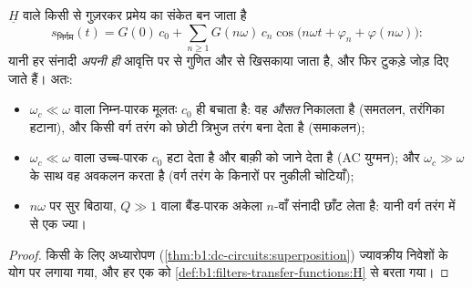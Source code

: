 \begin{proposition}\label{prop:b1:filters-transfer-functions:filtering}
 $\underline H$ वाले किसी  से गुज़रकर प्रमेय का संकेत
बन जाता है
\[
s_{\text{निर्गम}}(t) = G(0)\,c_0 + \sum_{n \geq 1} G(n\omega)\,c_n\cos\!\big(n\omega t + \varphi_n + \varphi(n\omega)\big):
\]
यानी हर संनादी \emph{अपनी ही} आवृत्ति पर  से गुणित और  से खिसकाया
जाता है, और फिर टुकड़े जोड़ दिए जाते हैं। अतः:
\begin{itemize}
  \item $\omega_c \ll \omega$ वाला निम्न-पारक मूलतः $c_0$ ही बचाता है:
        वह \emph{औसत} निकालता है (समतलन, तरंगिका हटाना), और किसी
        वर्ग तरंग को छोटी त्रिभुज तरंग बना देता है (समाकलन);
  \item $\omega_c \ll \omega$ वाला उच्च-पारक $c_0$ हटा देता है और बाक़ी को
        जाने देता है (AC युग्मन); और $\omega_c \gg \omega$ के साथ वह
        अवकलन करता है (वर्ग तरंग के किनारों पर नुकीली चोटियाँ);
  \item $n\omega$ पर सुर बिठाया, $Q \gg 1$ वाला बैंड-पारक अकेला
        $n$-वाँ संनादी छाँट लेता है: यानी वर्ग तरंग में से एक ज्या।
\end{itemize}
\end{proposition}

\begin{proof}
किसी  के लिए अध्यारोपण (\cref{thm:b1:dc-circuits:superposition})
ज्यावक्रीय निवेशों के योग पर लगाया गया, और हर एक को
\cref{def:b1:filters-transfer-functions:H} से बरता गया।
\end{proof}

